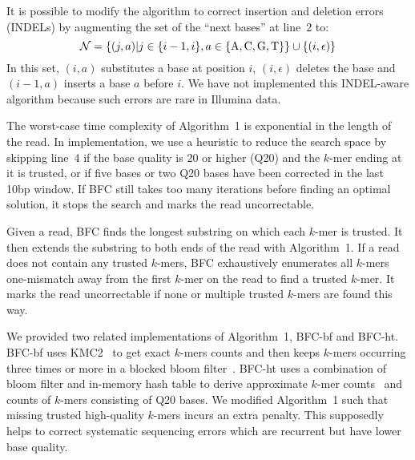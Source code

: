 \documentclass{bioinfo}
\begin{document}
\begin{methods}
It is possible to modify the algorithm to correct insertion and deletion
errors (INDELs) by augmenting the set of the ``next bases'' at line~2 to:
$$\mathcal{N}=\{(j,a)|j\in\{i-1,i\},a\in\{{\rm A},{\rm C},{\rm G},{\rm T}\}\}\cup\{(i,\epsilon)\}$$
In this set, $(i,a)$ substitutes a base at position $i$, $(i,\epsilon)$ deletes
the base and $(i-1,a)$ inserts a base $a$ before $i$. We have not
implemented this INDEL-aware algorithm because such
errors are rare in Illumina data.

The worst-case time complexity of Algorithm~1 is exponential in the length of
the read. In implementation, we use a heuristic to reduce the search space by
skipping line~4 if the base quality is 20 or higher (Q20) and the $k$-mer
ending at it is trusted, or if five bases or two Q20 bases have been corrected
in the last 10bp window. If BFC still takes too many iterations before finding
an optimal solution, it stops the search and marks the read uncorrectable.

Given a read, BFC finds the longest substring on which each $k$-mer is trusted. It
then extends the substring to both ends of the read with Algorithm~1. If a read
does not contain any trusted $k$-mers, BFC exhaustively enumerates all $k$-mers
one-mismatch away from the first $k$-mer on the read to find a trusted
$k$-mer. It marks the read uncorrectable if none or multiple trusted $k$-mers
are found this way.

We provided two related implementations of Algorithm~1, BFC-bf and BFC-ht.
BFC-bf uses KMC2~\citep{kmc2} to get exact $k$-mers counts and then keeps
$k$-mers occurring three times or more in a blocked bloom
filter~\citep{DBLP:conf/wea/PutzeSS07}. BFC-ht uses a combination of bloom
filter and in-memory hash table to derive approximate $k$-mer
counts~\citep{Melsted:2011bh} and counts of $k$-mers consisting of Q20 bases.
We modified Algorithm~1 such that missing trusted high-quality $k$-mers incurs
an extra penalty. This supposedly helps to correct systematic sequencing errors
which are recurrent but have lower base quality.


\end{methods}
\end{document}
